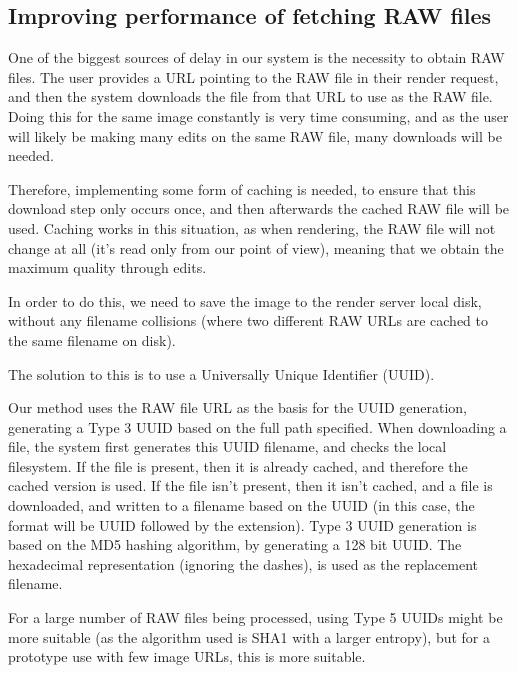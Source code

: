 \documentclass[10pt,a4paper]{article}
\begin{document}
\subsection{Improving performance of fetching RAW files}\label{LocalImageCaching}
One of the biggest sources of delay in our system is the necessity to obtain RAW files. The user
provides a URL pointing to the RAW file in their render request, and then the system downloads the file
from that URL to use as the RAW file. Doing this for the same image constantly is very time consuming, and
as the user will likely be making many edits on the same RAW file, many downloads will be needed.

Therefore, implementing some form of caching is needed, to ensure that this download step only occurs once,
and then afterwards the cached RAW file will be used. Caching works in this situation, as when rendering,
the RAW file will not change at all (it's read only from our point of view), meaning that we obtain the
maximum quality through edits.

In order to do this, we need to save the image to the render server local disk, without any filename collisions
(where two different RAW URLs are cached to the same filename on disk).

The solution to this is to use a Universally Unique Identifier (UUID).

Our method uses the RAW file URL as the basis for the UUID generation, generating a Type 3 UUID based on the full path specified.
When downloading a file, the system first generates this UUID filename, and checks the local filesystem. If the file is present, then it
is already cached, and therefore the cached version is used. If the file isn't present, then it isn't cached, and a file is downloaded, and 
written to a filename based on the UUID (in this case, the format will be UUID followed by the extension). Type 3 UUID generation is based on
the MD5 hashing algorithm, by generating a 128 bit UUID. The hexadecimal representation (ignoring the dashes), is used as the replacement filename.


For a large number of RAW files being processed, using Type 5 UUIDs might be more suitable (as the algorithm used is SHA1 with a larger entropy), but
for a prototype use with few image URLs, this is more suitable.
\end{document}
